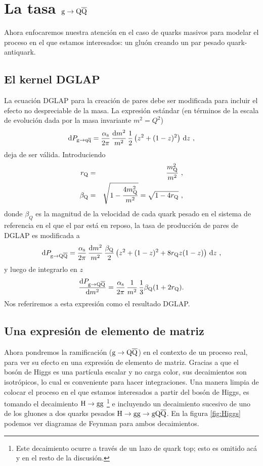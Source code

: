 \section{La tasa ${\mathrm g}\to{\mathrm Q}\overline{\mathrm Q}$}

Ahora enfocaremos nuestra atención en el caso de quarks masivos para modelar el proceso en el que estamos interesados: un gluón creando un par pesado quark-antiquark.

\subsection{El kernel DGLAP}

La ecuación DGLAP para la creación de pares debe ser modificada para incluir el efecto no despreciable de la masa. La expresión estándar (en términos de la escala de evolución dada por la masa invariante $m^2=Q^2$)
\begin{equation}
{\mathrm d} P_{{\mathrm g} \to {\mathrm q}\overline{\mathrm q}} = \frac{\alpha_{\mathrm{s}}}{2\pi} \, \frac{{\mathrm d} m^2}{m^2} \,
\frac{1}{2} \left( z^2 + (1 - z)^2 \right) \, {\mathrm d} z ~ ,
\label{eq:DGLAP:gqq}
\end{equation}
deja de ser válida. Introduciendo
\begin{eqnarray}
 r_{{\mathrm Q}} & = & \frac{ m_{{\mathrm Q}}^2 }{ m^2 } ~, \\
\beta_{{\mathrm Q}} & = & \sqrt{ 1 - \frac{ 4 m_{{\mathrm Q}}^2 }{ m^2 } }
   = \sqrt{ 1 - 4 r_{{\mathrm Q}} } ~,
\end{eqnarray}
donde $\beta_Q$ es la magnitud de la velocidad de cada quark pesado en el sistema de referencia en el que el par está en reposo, la tasa de producción de pares de DGLAP es modificada a
\begin{equation}
{\mathrm d} P_{{\mathrm g} \to {\mathrm Q}\overline{\mathrm Q}} = \frac{\alpha_{\mathrm{s}}}{2\pi} \, \frac{{\mathrm d} m^2}{m^2} \,
\frac{\beta_{{\mathrm Q}}}{2} \left( z^2 + (1 - z)^2 + 8 r_{{\mathrm Q}} z (1 - z) \right) 
\, {\mathrm d} z ~ , 
\end{equation}
y luego de integrarlo en $z$
\begin{equation}
\frac{{\mathrm d} P_{{\mathrm g} \to {\mathrm Q}\overline{\mathrm Q}}}{{\mathrm d} m^2} = \frac{\alpha_{\mathrm{s}}}{2\pi} \, \frac{1}{m^2} \,
\frac{1}{3} \beta_{{\mathrm Q}} (1 + 2 r_{{\mathrm Q}}).
\label{m2DGLAP} 
\end{equation}
Nos referiremos a esta expresión como el resultado DGLAP.

\subsection{Una expresión de elemento de matriz}

Ahora pondremos la ramificación (${\mathrm g}\to{\mathrm Q}\overline{\mathrm Q}$) en el contexto de un proceso real, para ver su efecto en una expresión de elemento de matriz. Gracias a que el bosón de Higgs es una partícula escalar y no carga color, sus decaimientos son isotrópicos, lo cual es conveniente para hacer integraciones. Una manera limpia de colocar el proceso en el que estamos interesados a partir del bosón de Higgs, es tomando el decaimiento ${\mathrm H}\to{\mathrm g}{\mathrm g}$ \footnote{Este decaimiento ocurre a través de un lazo de quark top; esto es omitido acá y en el resto de la discusión.} e incluyendo un decaimiento sucesivo de uno de los gluones a dos quarks pesados ${\mathrm H}\to{\mathrm g}{\mathrm g}\to{\mathrm g}{\mathrm Q}\overline{\mathrm Q}$. En la figura \ref{fig:Higgs} podemos ver diagramas de Feynman para ambos decaimientos. 

